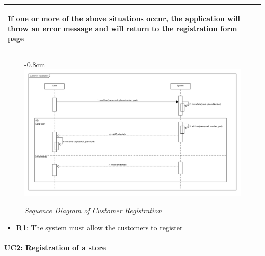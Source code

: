 \documentclass{article}
\begin{document}
\begin{center}
\begin{adjustwidth}{-3cm}{}
\begin{tabular}[h!]{|m{7.5em}|m{36em}|}
\begin{enumerate}
						\end{enumerate}
						If one or more of the above situations occur, the application will throw an error message and will return to the registration form page\\		
						\hline
						
					\end{tabular}

					
					

					\begin{figure}[!h]
						\begin{adjustwidth} {-0.8cm}{}
							\includegraphics[scale=0.36]{SD/1_customerRegistration.pdf}
						\end{adjustwidth}
						\caption{\emph{Sequence Diagram of Customer Registration}}
					\end{figure}
					\end{adjustwidth}
				
					\begin{itemize}
					\medskip
					{\bfseries Required functional requirements: }
					\item {\bfseries R1}: The system must allow the customers to register


					\end{itemize}
				\end{center}
			\bigskip
			\paragraph{UC2: Registration of a store}
			
\end{document}
